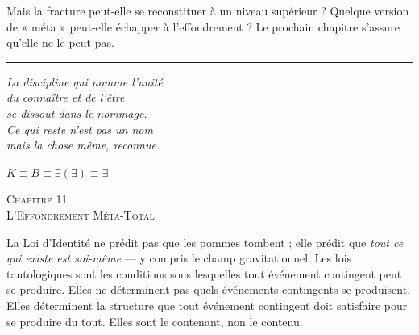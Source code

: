 \documentclass[10pt, openany, oneside]{book}
\renewcommand{\large}{\fontsize{11.5}{14}\selectfont}
\renewcommand{\huge}{\fontsize{17}{21}\selectfont}
\begin{document}
Mais la fracture peut-elle se reconstituer à un niveau supérieur ? Quelque version de « méta » peut-elle échapper à l'effondrement ? Le prochain chapitre s'assure qu'elle ne le peut pas.

\vspace{2em}

\begin{center}
    \rule{0.15\textwidth}{0.3pt}
\end{center}

\vspace{0.5em}

\begin{center}
    \itshape
    La discipline qui nomme l'unité\\
    du connaître et de l'être\\
    se dissout dans le nommage.\\[0.8em]
    Ce qui reste n'est pas un nom\\
    mais la chose même, reconnue.
\end{center}

\vspace{0.5em}

\begin{center}
    $K \equiv B \equiv \exists(\exists) \equiv \exists$
\end{center}

%
%
%
%

\newpage

\begin{center}
    {\huge\scshape Chapitre 11}\\[0.3em]
    {\large\scshape L'Effondrement Méta-Total}
\end{center}



\noindent La Loi d'Identité ne prédit pas que les pommes tombent ; elle prédit que \textit{tout ce qui existe est soi-même} --- y compris le champ gravitationnel. Les lois tautologiques sont les conditions sous lesquelles tout événement contingent peut se produire. Elles ne déterminent pas quels événements contingents se produisent. Elles déterminent la structure que tout événement contingent doit satisfaire pour se produire du tout. Elles sont le contenant, non le contenu.
\end{document}
